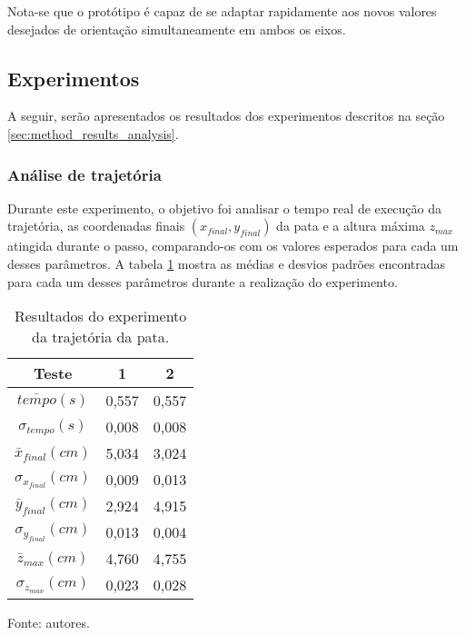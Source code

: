 \documentclass[../main.tex]{subfiles}
\begin{document}
  Nota-se que o protótipo é capaz de se adaptar rapidamente aos novos valores desejados de orientação simultaneamente em ambos os eixos.

  \subsection{Experimentos}
  A seguir, serão apresentados os resultados dos experimentos descritos na seção \ref{sec:method_results_analysis}.

  \subsubsection{Análise de trajetória}
  Durante este experimento, o objetivo foi analisar o tempo real de execução da trajetória, as coordenadas finais $(x_{final}, y_{final})$ da pata e a altura máxima $z_{max}$ atingida durante o passo, comparando-os com os valores esperados para cada um desses parâmetros. A tabela \ref{tab:trajetoria} mostra as médias e desvios padrões encontradas para cada um desses parâmetros durante a realização do experimento.

  \begin{table}[!htb]
    \caption{Resultados do experimento da trajetória da pata.}
    \centering
    \begin{tabular}{ccc}
      \hline
      Teste & 1         & 2        \\
      \hline
      $\bar{tempo} (s)$         & 0,557  & 0,557 \\
      \hline
      $\sigma_{tempo} (s)$       & 0,008  & 0,008 \\
      \hline
      $\bar{x}_{final} (cm)$     & 5,034  & 3,024 \\
      \hline
      $\sigma_{x_{final}} (cm)$  & 0,009  & 0,013 \\
      \hline
      $\bar{y}_{final} (cm)$     & 2,924  & 4,915 \\      
      \hline
      $\sigma_{y_{final}} (cm)$  & 0,013  & 0,004 \\      
      \hline
      $\bar{z}_{max} (cm)$       & 4,760  & 4,755 \\      
      \hline
      $\sigma_{z_{max}} (cm)$    & 0,023  & 0,028 \\
      \hline   
    \end{tabular}

    Fonte: autores.
    \label{tab:trajetoria}
  \end{table}
\end{document}
